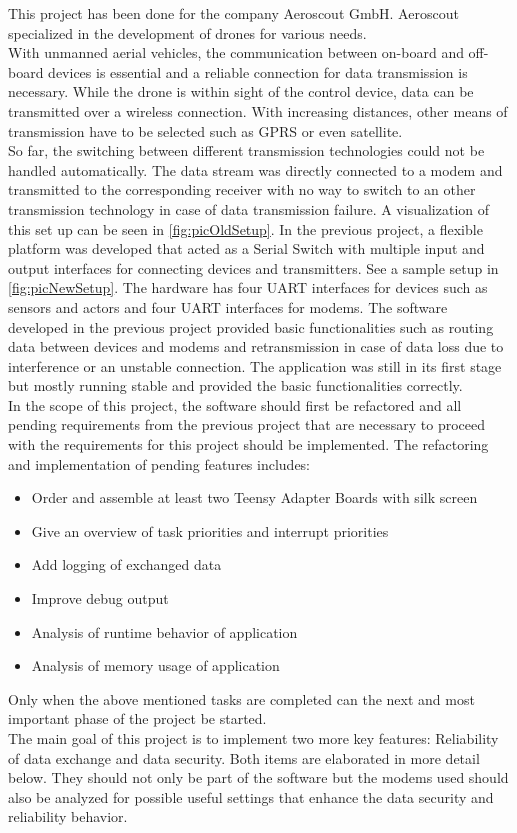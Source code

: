 %
\label{sec:txtAufgabenstellung}
This project has been done for the company Aeroscout GmbH. Aeroscout specialized in the development of drones for various needs. \\
With unmanned aerial vehicles, the communication between on-board and off-board devices is essential and a reliable connection for data transmission is necessary. While the drone is within sight of the control device, data can be transmitted over a wireless connection. With increasing distances, other means of transmission have to be selected such as GPRS or even satellite.\\
So far, the switching between different transmission technologies could not be handled automatically. The data stream was directly connected to a modem and transmitted to the corresponding receiver with no way to switch to an other transmission technology in case of data transmission failure. A visualization of this set up can be seen in \autoref{fig:picOldSetup}.
%
%
In the previous project, a flexible platform was developed that acted as a Serial Switch with multiple input and output interfaces for connecting devices and transmitters. See a sample setup in \autoref{fig:picNewSetup}. The hardware has four UART interfaces for devices such as sensors and actors and four UART interfaces for modems. The software developed in the previous project provided basic functionalities such as routing data between devices and modems and retransmission in case of data loss due to interference or an unstable connection. The application was still in its first stage but mostly running stable and provided the basic functionalities correctly.\\
In the scope of this project, the software should first be refactored and all pending requirements from the previous project that are necessary to proceed with the requirements for this project should be implemented. The  refactoring and implementation of pending features includes: \begin{itemize}
    \item Order and assemble at least two Teensy Adapter Boards with silk screen
    \item Give an overview of task priorities and interrupt priorities
    \item Add logging of exchanged data
    \item Improve debug output
    \item Analysis of runtime behavior of application
    \item Analysis of memory usage of application
\end{itemize}
Only when the above mentioned tasks are completed can the next and most important phase of the project be started.\\
The main goal of this project is to implement two more key features: Reliability of data exchange and data security. Both items are elaborated in more detail below. They should not only be part of the software but the modems used should also be analyzed for possible useful settings that enhance the data security and reliability behavior.
%
%
%
